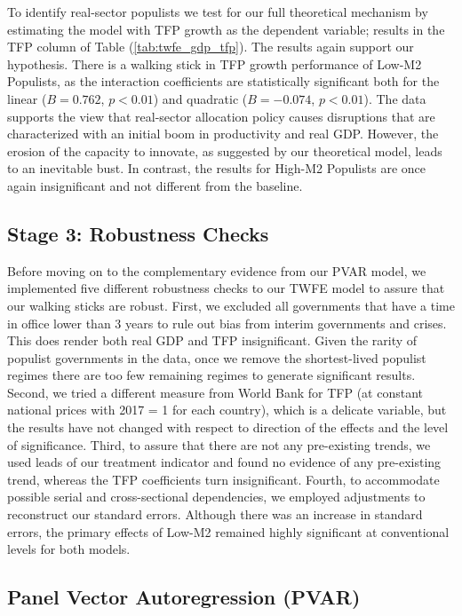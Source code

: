 \documentclass{OUP-EJ}
\begin{document}
To identify real-sector populists we test for our full theoretical mechanism by estimating the model with TFP growth as the dependent variable; results in the TFP column of Table (\ref{tab:twfe_gdp_tfp}).  The results again support our hypothesis. There is a walking stick in TFP growth performance of Low-M2 Populists, as the interaction coefficients are statistically significant both for the linear ($B=0.762$, $p < 0.01$) and quadratic ($B=-0.074$, $p < 0.01$). The data supports the view that real-sector allocation policy causes disruptions that are characterized with an initial boom in productivity and real GDP. However, the erosion of the capacity to innovate, as suggested by our theoretical model, leads to an inevitable bust. In contrast, the results for High-M2 Populists are once again insignificant and not different from the baseline.

\subsection{Stage 3: Robustness Checks }

Before moving on to the complementary evidence from our PVAR model, we implemented five different robustness checks to our TWFE model to assure that our walking sticks are robust. First, we excluded all governments that have a time in office lower than 3 years to rule out bias from interim governments and crises. This does render both real GDP and TFP insignificant.  Given the rarity of populist governments in the data, once we remove the shortest-lived populist regimes there are too few remaining regimes to generate significant results.  Second, we tried a different measure from World Bank for TFP (at constant national prices with 2017 = 1 for each country), which is a delicate variable, but the results have not changed with respect to direction of the effects and the level of significance. Third, to assure that there are not any pre-existing trends, we used leads of our treatment indicator and found no evidence of any pre-existing trend, whereas the TFP coefficients turn insignificant. Fourth, to accommodate possible serial and cross-sectional dependencies, we employed \cite{DriscollKraay1998} adjustments to reconstruct our standard errors. Although there was an increase in standard errors, the primary effects of Low-M2 remained highly significant at conventional levels for both models.

\subsection{Panel Vector Autoregression (PVAR)}
\end{document}
